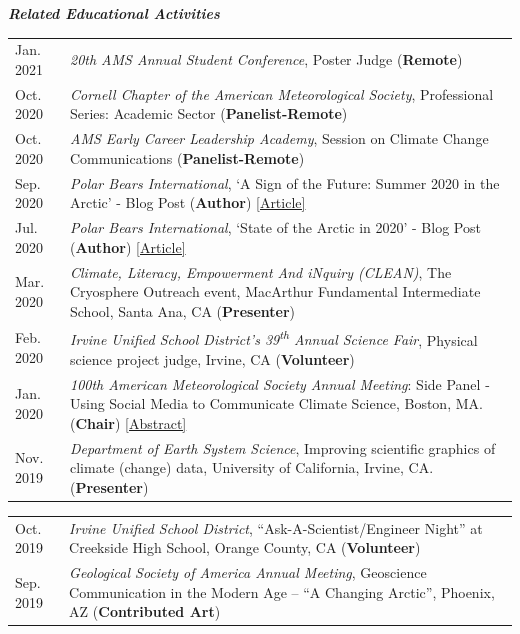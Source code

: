 \documentclass[margin,line,palatino,courier,10pt]{res}
\begin{document}
\begin{resume}
\textit{\textbf{Related Educational Activities}}
\vspace*{0.05in}\\
\begin{tabular}{@{}p{0.9in}p{4in}}
Jan. 2021 & \textit{20th AMS Annual Student Conference}, Poster Judge (\textbf{Remote})\\
Oct. 2020 & \textit{Cornell Chapter of the American Meteorological Society}, Professional Series: Academic Sector (\textbf{Panelist-Remote})\\
Oct. 2020 & \textit{AMS Early Career Leadership Academy}, Session on Climate Change Communications (\textbf{Panelist-Remote})\\
Sep. 2020 & \textit{Polar Bears International}, `A Sign of the Future: Summer 2020 in the Arctic' - Blog Post (\textbf{Author}) \href{https://polarbearsinternational.org/news/article-climate-change/a-sign-of-the-future-summer-2020-in-the-arctic/}{[Article]}\\
Jul. 2020 & \textit{Polar Bears International}, `State of the Arctic in 2020' - Blog Post (\textbf{Author}) \href{https://polarbearsinternational.org/news/article-climate-change/state-of-the-arctic-in-2020/}{[Article]}\\
Mar. 2020 &\textit{Climate, Literacy, Empowerment And iNquiry (CLEAN)}, The Cryosphere Outreach event, MacArthur Fundamental Intermediate School, Santa Ana, CA (\textbf{Presenter})\\
Feb. 2020 & \textit{Irvine Unified School District's 39\textsuperscript{th} Annual Science Fair}, Physical science project judge, Irvine, CA (\textbf{Volunteer})\\
Jan. 2020 & \textit{100th American Meteorological Society Annual Meeting}: Side Panel - Using Social Media to Communicate Climate Science, Boston, MA. (\textbf{Chair}) \href{https://ams.confex.com/ams/2020Annual/meetingapp.cgi/Session/53195}{[Abstract]}\\
Nov. 2019 & \textit{Department of Earth System Science}, Improving scientific graphics of climate (change) data, University of California, Irvine, CA. (\textbf{Presenter})\\
\end{tabular}
\begin{tabular}{@{}p{0.9in}p{4in}}
Oct. 2019 & \textit{Irvine Unified School District}, ``Ask-A-Scientist/Engineer Night'' at Creekside High School, Orange County, CA (\textbf{Volunteer})\\
Sep. 2019 & \textit{Geological Society of America Annual Meeting}, Geoscience Communication in the Modern Age -- ``A Changing Arctic'', Phoenix, AZ (\textbf{Contributed Art})\\

\end{tabular}
\end{resume}
\end{document}
